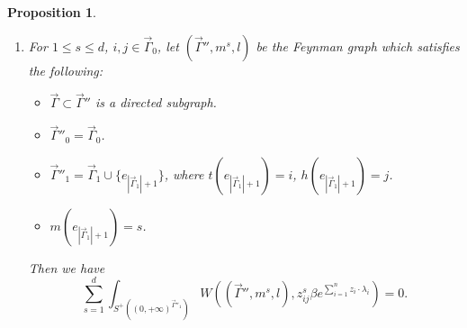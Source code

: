 \documentclass[11pt]{amsart}
\newtheorem{prop}[thm]{Proposition}
\theoremstyle{definition}
\theoremstyle{remark}
\numberwithin{equation}{section}
\begin{document}
\begin{prop}
\begin{enumerate}
\begin{itemize}
        \end{itemize}
        Then we have
        \begin{align}\label{well-defined formula}
        \sum_{s=1}^{d}\int_{S^{+}((0,+\infty)^{\vec{\Gamma}'_{1}})}W((\vec{\Gamma}',m^{s},l),z_{ij}^{s}\beta e^{\sum_{i=1}^{n}z_{i}\cdot\lambda_{i}})=
        \int_{S^{+}((0,+\infty)^{\vec{\Gamma}_{1}})}W((\vec{\Gamma},m,l),\beta e^{\sum_{i=1}^{n}z_{i}\cdot\lambda_{i}}).    
        \end{align}
        \item For $1\leq s\leq d$, $i,j\in \vec{\Gamma}_{0}$, let $(\vec{\Gamma}'',m^{s},l)$ be the Feynman graph which satisfies the following:
        \begin{itemize}
            \item $\vec{\Gamma}\subset\vec{\Gamma}''$ is a directed subgraph.
            \item $\vec{\Gamma}''_{0}=\vec{\Gamma}_{0}$.
            \item $\vec{\Gamma}''_{1}=\vec{\Gamma}_{1}\cup\{e_{|\vec{\Gamma}_{1}|+1}\}$, where $t(e_{|\vec{\Gamma}_{1}|+1})=i$, $h(e_{|\vec{\Gamma}_{1}|+1})=j$.
            \item $m(e_{|\vec{\Gamma}_{1}|+1})=s$.
        \end{itemize}
        Then we have
        $$
        \sum_{s=1}^{d}\int_{S^{+}((0,+\infty)^{\vec{\Gamma}''_{1}})}W((\vec{\Gamma}'',m^{s},l),z_{ij}^{s}\beta e^{\sum_{i=1}^{n}z_{i}\cdot\lambda_{i}})=0.
        $$
    \end{enumerate}
\end{prop}
\end{document}
